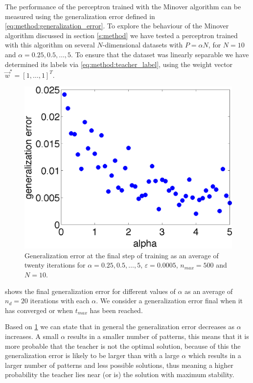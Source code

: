 The performance of the perceptron trained with the Minover algorithm can be measured using the generalization error defined in \autoref{eq:method:generalization_error}. To explore the behaviour of the Minover algorithm discussed in section \ref{s:method} we have tested a perceptron trained with this algorithm on several $N$-dimensional datasets with $P = \alpha N$, for $N = 10$ and $\alpha = 0.25, 0.5, \dotsc, 5$. To ensure that the dataset was linearly separable we have determined its labels via \eqref{eq:method:teacher_label}, using the weight vector $\vec{w}^* = [1, \dotsc, 1]^T$.\\

\begin{figure}[b]
	\centering
	\includegraphics[width=0.9\columnwidth]{./img/finalgeneralizationerrors}
	\caption{Generalization error at the final step of training as an average of twenty iterations for $\alpha = 0.25, 0.5, \dotsc, 5$, $\varepsilon = 0.0005$, $n_{max} = 500$ and $N = 10$.}
	\label{fig:exp:finalgeneralizationError}
\end{figure}

 shows the final generalization error for different values of $\alpha$ as an average of $n_d = 20$ iterations with each $\alpha$. We consider a generalization error final when it has converged or when $t_{max}$ has been reached. 

Based on \cref{fig:exp:finalgeneralizationError} we can state that in general the generalization error decreases as $\alpha$ increases. A small $\alpha$ results in a smaller number of patterns, this means that it is more probable that the teacher is not the optimal solution, because of this the generalization error is likely to be larger than with a large $\alpha$ which results in a larger number of patterns and less possible solutions, thus meaning a higher probability the teacher lies near (or is) the solution with maximum stability.

